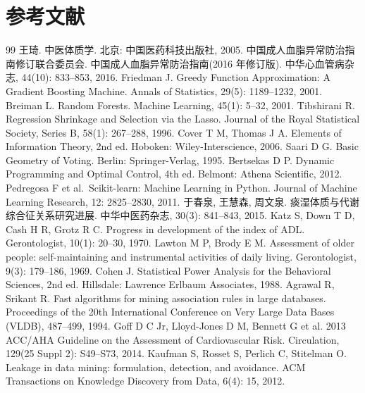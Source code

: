 \documentclass{MathorCupmodeling}
\begin{document}
\section{参考文献}

\begin{thebibliography}{99}
 王琦. 中医体质学. 北京: 中国医药科技出版社, 2005.
 中国成人血脂异常防治指南修订联合委员会. 中国成人血脂异常防治指南(2016 年修订版). 中华心血管病杂志, 44(10): 833--853, 2016.
 Friedman J. Greedy Function Approximation: A Gradient Boosting Machine. Annals of Statistics, 29(5): 1189--1232, 2001.
 Breiman L. Random Forests. Machine Learning, 45(1): 5--32, 2001.
 Tibshirani R. Regression Shrinkage and Selection via the Lasso. Journal of the Royal Statistical Society, Series B, 58(1): 267--288, 1996.
 Cover T M, Thomas J A. Elements of Information Theory, 2nd ed. Hoboken: Wiley-Interscience, 2006.
 Saari D G. Basic Geometry of Voting. Berlin: Springer-Verlag, 1995.
 Bertsekas D P. Dynamic Programming and Optimal Control, 4th ed. Belmont: Athena Scientific, 2012.
 Pedregosa F et al.~Scikit-learn: Machine Learning in Python. Journal of Machine Learning Research, 12: 2825--2830, 2011.
 于春泉, 王慧森, 周文泉. 痰湿体质与代谢综合征关系研究进展. 中华中医药杂志, 30(3): 841--843, 2015.
 Katz S, Down T D, Cash H R, Grotz R C. Progress in development of the index of ADL. Gerontologist, 10(1): 20--30, 1970.
 Lawton M P, Brody E M. Assessment of older people: self-maintaining and instrumental activities of daily living. Gerontologist, 9(3): 179--186, 1969.
 Cohen J. Statistical Power Analysis for the Behavioral Sciences, 2nd ed. Hillsdale: Lawrence Erlbaum Associates, 1988.
 Agrawal R, Srikant R. Fast algorithms for mining association rules in large databases. Proceedings of the 20th International Conference on Very Large Data Bases (VLDB), 487--499, 1994.
 Goff D C Jr, Lloyd-Jones D M, Bennett G et al. 2013 ACC/AHA Guideline on the Assessment of Cardiovascular Risk. Circulation, 129(25 Suppl 2): S49--S73, 2014.
 Kaufman S, Rosset S, Perlich C, Stitelman O. Leakage in data mining: formulation, detection, and avoidance. ACM Transactions on Knowledge Discovery from Data, 6(4): 15, 2012.

\end{thebibliography}
\end{document}
